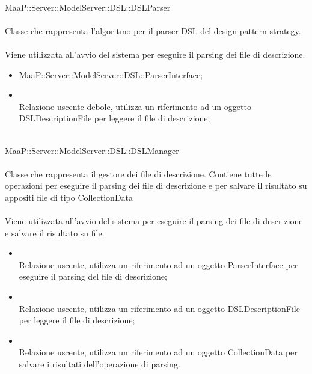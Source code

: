 	\\
	MaaP::Server::ModelServer::DSL::DSLParser\\
	\\
	Classe che rappresenta l'algoritmo per il parser DSL del design pattern strategy.\\
	\\
	Viene utilizzata all'avvio del sistema per eseguire il parsing dei file di descrizione.
	\begin{itemize}
	\item MaaP::Server::ModelServer::DSL::ParserInterface;
	\end{itemize}
	\begin{itemize}
	\item{}\\
	Relazione uscente debole, utilizza un riferimento ad un oggetto DSLDescriptionFile per leggere il file di descrizione;
	\end{itemize}
		
	\\
	MaaP::Server::ModelServer::DSL::DSLManager\\
	\\
	Classe che rappresenta il gestore dei file di descrizione. Contiene tutte le operazioni per eseguire il parsing dei file di descrizione e per salvare il risultato su appositi file di tipo CollectionData\\
	\\
	Viene utilizzata all'avvio del sistema per eseguire il parsing dei file di descrizione e salvare il risultato su file.
	\begin{itemize}
	\item{}\\
	Relazione uscente, utilizza un riferimento ad un oggetto ParserInterface per eseguire il parsing del file di descrizione;
	\item{}\\
	Relazione uscente, utilizza un riferimento ad un oggetto DSLDescriptionFile per leggere il file di descrizione;
	\item{}\\
	Relazione uscente, utilizza un riferimento ad un oggetto CollectionData per salvare i risultati dell'operazione di parsing.
	\end{itemize}
	
